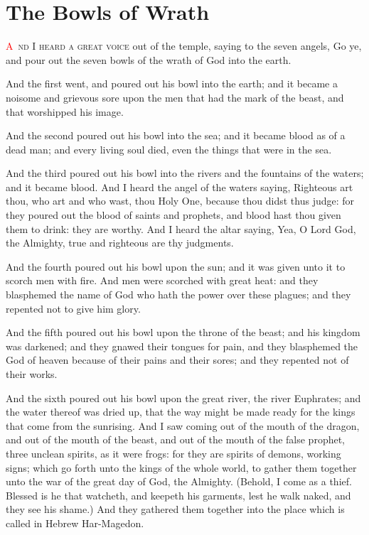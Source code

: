 
\chapter{The Bowls of Wrath}
\lettrine[lines=3,slope=-0.5em]{\textcolor{red}{A}}{\ nd I heard a great voice} out of the temple, saying to the seven angels, Go ye, and pour out the seven bowls of the wrath of God into the earth.

 And the first went, and poured out his bowl into the earth; and it became a noisome and grievous sore upon the men that had the mark of the beast, and that worshipped his image.

 And the second poured out his bowl into the sea; and it became blood as of a dead man; and every living soul died, even the things that were in the sea.

 And the third poured out his bowl into the rivers and the fountains of the waters; and it became blood. 
 And I heard the angel of the waters saying, Righteous art thou, who art and who wast, thou Holy One, because thou didst thus judge: 
 for they poured out the blood of saints and prophets, and blood hast thou given them to drink: they are worthy. 
 And I heard the altar saying, Yea, O Lord God, the Almighty, true and righteous are thy judgments.

 And the fourth poured out his bowl upon the sun; and it was given unto it to scorch men with fire. 
 And men were scorched with great heat: and they blasphemed the name of God who hath the power over these plagues; and they repented not to give him glory.

 And the fifth poured out his bowl upon the throne of the beast; and his kingdom was darkened; and they gnawed their tongues for pain, 
 and they blasphemed the God of heaven because of their pains and their sores; and they repented not of their works.

 And the sixth poured out his bowl upon the great river, the river Euphrates; and the water thereof was dried up, that the way might be made ready for the kings that come from the sunrising. 
 And I saw coming out of the mouth of the dragon, and out of the mouth of the beast, and out of the mouth of the false prophet, three unclean spirits, as it were frogs: 
 for they are spirits of demons, working signs; which go forth unto the kings of the whole world, to gather them together unto the war of the great day of God, the Almighty. 
 (Behold, I come as a thief. Blessed is he that watcheth, and keepeth his garments, lest he walk naked, and they see his shame.) 
 And they gathered them together into the place which is called in Hebrew Har-Magedon.

